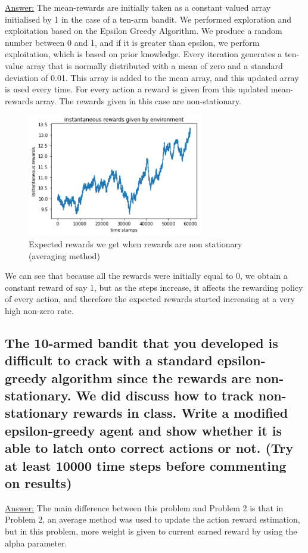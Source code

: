 \documentclass[15pt,journal]{IEEEtran}
\begin{document}
\underline{Answer:}
The mean-rewards are initially taken as a constant valued array initialised by 1 in the case of a ten-arm bandit. We performed exploration and exploitation based on the
Epsilon Greedy Algorithm.  We produce a random number between 0 and 1, and if it is greater than epsilon, we perform exploitation, which is based on prior knowledge.
Every iteration generates a ten-value array that is normally distributed with a mean of zero and a standard deviation of 0.01. This array is added to the mean array, and this updated array is used every time. For every action a reward is given from this updated mean-rewards array. The rewards given in this case are non-stationary.


\begin{figure}[H]%
\begin {center}
\includegraphics[width=7.7cm]{images/lab9__3.PNG}
\caption{Expected rewards we get when rewards are non
stationary (averaging method)} 
\label{fig:ecg}
\end {center}
\end{figure}




We can see that because all the rewards were initially equal to 0, we obtain a constant reward of say 1, but as the steps increase, it affects the rewarding policy of every action, and therefore the expected rewards started increasing at a very high non-zero rate.

\subsection { The 10-armed bandit that you developed is difficult to crack with a standard epsilon-greedy algorithm since the rewards are non-stationary.  We did discuss how to track non-stationary rewards in class.  Write a modified epsilon-greedy agent and show whether it is able to latch onto correct actions or not.  (Try at least 10000 time steps before commenting on results)}
\underline{Answer:}
The main difference between this problem and Problem 2 is that in Problem 2, an average method was used to update the action reward estimation, but in this problem, more weight is given to current earned reward by using the alpha parameter.
\end{document}
